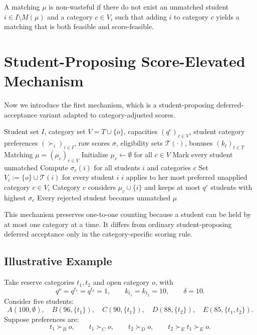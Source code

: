 \documentclass[runningheads]{llncs}
\newcommand{\T}{\mathcal{T}}
\newcommand{\1}{\mathbf{1}}
\begin{document}
\begin{definition}
A matching $\mu$ is non-wasteful if there do not exist an unmatched student $i\in I\setminus M(\mu)$ and a category $c\in V_i$ such that adding $i$ to category $c$ yields a matching that is both feasible and score-feasible.
\end{definition}

\section{Student-Proposing Score-Elevated Mechanism}
Now we introduce the first mechanism, which is a student-proposing deferred-acceptance variant adapted to category-adjusted scores.

\begin{algorithm}[H]
\caption{Student-Proposing Score-Elevated Mechanism (SPSE)}
\begin{algorithmic}[1]
\Require Student set $I$, category set $V=T\cup\{o\}$, capacities $(q^c)_{c\in V}$, student category preferences $(\succ_i)_{i\in I}$, raw scores $\sigma$, eligibility sets $\T(\cdot)$, bonuses $(k_t)_{t\in T}$
\Ensure Matching $\mu=(\mu_c)_{c\in V}$
\State Initialize $\mu_c\gets\emptyset$ for all $c\in V$
\State Mark every student unmatched
\State Compute $\sigma_c(i)$ for all students $i$ and categories $c$
\State Set $V_i:=\{o\}\cup\T(i)$ for every student $i$
    \State $i$ applies to her most preferred unapplied category $c\in V_i$
    \State Category $c$ considers $\mu_c\cup\{i\}$ and keeps at most $q^c$ students with highest $\sigma_c$
    \State Every rejected student becomes unmatched
\EndWhile
\State \Return $\mu$
\end{algorithmic}
\end{algorithm}

This mechanism preserves one-to-one counting because a student can be held by at most one category at a time. It differs from ordinary student-proposing deferred acceptance only in the category-specific scoring rule.

\subsection{Illustrative Example}

Take reserve categories $t_1,t_2$ and open category $o$, with
\[
q^o=q^{t_1}=q^{t_2}=1,\qquad k_{t_1}=k_{t_2}=10,\qquad \delta=10.
\]
Consider five students:
\[
A(100,\emptyset),\quad B(96,\{t_1\}),\quad C(90,\{t_1\}),\quad D(88,\{t_2\}),\quad E(85,\{t_1,t_2\}).
\]
Suppose preferences are:
\[
t_1\succ_B o,\qquad t_1\succ_C o,\qquad t_2\succ_D o,\qquad t_2\succ_E t_1\succ_E o.
\]
\end{document}
